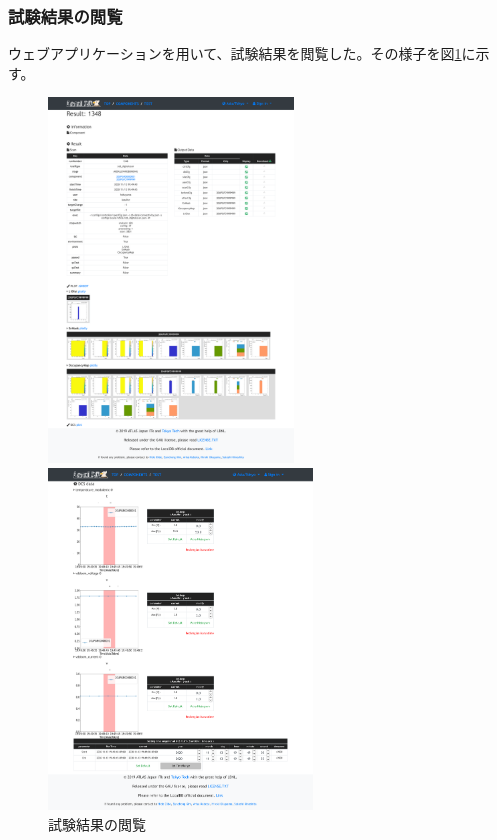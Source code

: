 \subsubsection{試験結果の閲覧}
ウェブアプリケーションを用いて、試験結果を閲覧した。その様子を図\ref{demo_view_result}に示す。
\begin{figure}[bpt]\centering
  \begin{center}
  \begin{minipage}{0.4\hsize}
    \includegraphics[width=65mm]{demo_view_scan_result}
  \end{minipage}
  \begin{minipage}{0.4\hsize}
    \includegraphics[width=7cm]{demo_view_dcs}
  \end{minipage}
  \caption[試験結果の閲覧]{試験結果の閲覧}
  \label{demo_view_result}
  \end{center}
\end{figure}


